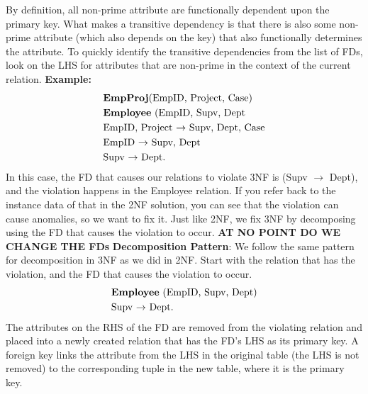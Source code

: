 \documentclass{report}
\begin{document}
\begin{itemize}
            \bigbreak \noindent 
            By definition, all non-prime attribute are functionally dependent upon the primary key. What makes a transitive dependency is that there is also some non-prime attribute (which also depends on the key) that also functionally determines the attribute.
            \bigbreak \noindent 
            To quickly identify the transitive dependencies from the list of FDs, look on the LHS for attributes that are non-prime in the context of the current relation.
            \bigbreak \noindent 
            \textbf{Example:}
            \begin{align*}
                &\text{\textbf{EmpProj}(EmpID, Project, Case)} \\
                &\text{\textbf{Employee} (EmpID, Supv, Dept} \\
                &\text{EmpID, Project $\to$ Supv, Dept, Case} \\
                &\text{EmpID $\to$ Supv, Dept} \\
                &\text{Supv $\to$ Dept}
            .\end{align*}
            \bigbreak \noindent 
            In this case, the FD that causes our relations to violate 3NF is (Supv $\to$ Dept), and the violation happens in the
            Employee relation. If you refer back to the instance data of that in the 2NF solution, you can see that the
            violation can cause anomalies, so we want to fix it.
            \bigbreak \noindent 
            Just like 2NF, we fix 3NF by decomposing using the FD that causes the violation to occur. \textbf{AT NO POINT DO WE CHANGE THE FDs}
            \bigbreak \noindent 
            \textbf{Decomposition Pattern}: We follow the same pattern for decomposition in 3NF as we did in 2NF. Start with the relation that has the violation, and the FD that causes the violation to occur.
            \begin{align*}
                &\text{\textbf{Employee} (EmpID, Supv, Dept)} \\
                &\text{Supv $\to$ Dept}
            .\end{align*}
            \bigbreak \noindent 
            The attributes on the RHS of the FD are removed from the violating relation and placed into a newly created
            relation that has the FD's LHS as its primary key. A foreign key links the attribute from the LHS in the original table
            (the LHS is not removed) to the corresponding tuple in the new table, where it is the primary key.
            \begin{align*}

\end{align*}
\end{itemize}
\end{document}
